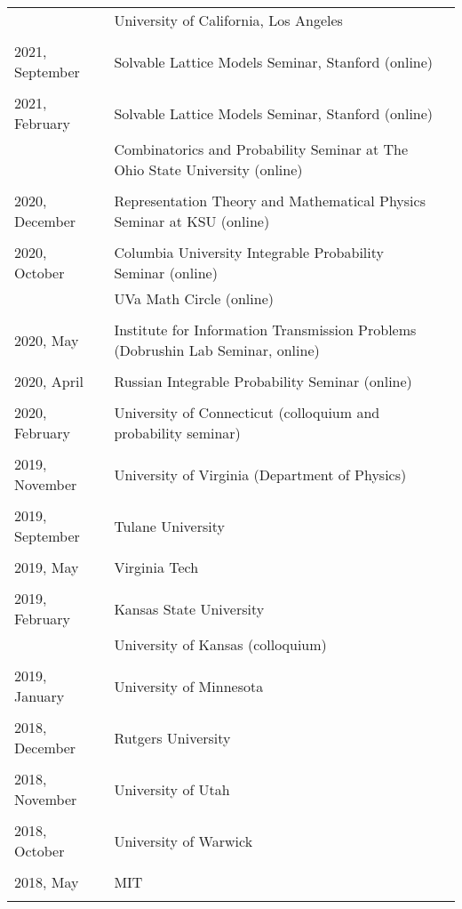 \documentclass[letterpaper,11pt]{article}
\begin{document}
\begin{longtable}{llc}
	& University of California, Los Angeles
	\\\\
	2021, September
	& Solvable Lattice Models Seminar, Stanford (online)
	\\\\
	2021, February
	& Solvable Lattice Models Seminar, Stanford (online)
	\\
	&
	Combinatorics and Probability Seminar at The Ohio State University (online)
	\\\\
	2020, December
	& Representation Theory and Mathematical Physics Seminar at KSU (online)
	\\\\
	2020, October
	& Columbia University Integrable Probability Seminar (online)
	\\
	&
	UVa Math Circle (online)
	\\\\
	2020, May
	& Institute for Information Transmission Problems
	(Dobrushin Lab Seminar, online)
	\\\\
	2020, April
	& Russian Integrable Probability Seminar (online)
	\\\\
	2020, February
	& University of Connecticut (colloquium and probability seminar)
	\\\\
	2019, November
	& University of Virginia (Department of Physics)
	\\\\
	2019, September
	& Tulane University
	\\\\
	2019, May
	& Virginia Tech
	\\\\
	2019, February
	& Kansas State University \\
	& University of Kansas (colloquium)
	\\\\
	2019, January
	& University of Minnesota
	\\\\
	2018, December
	& Rutgers University
	\\\\
	2018, November
	& University of Utah
	\\\\
	2018, October
	& University of Warwick
	\\\\
	2018, May
	& MIT
	\\\\

\end{longtable}
\end{document}
